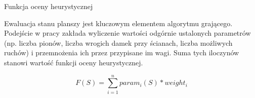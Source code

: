 \begin{frame}{Funkcja oceny heurystycznej}

	Ewaluacja stanu planszy jest kluczowym elementem algorytmu grającego. Podejście w pracy zakłada wyliczenie wartości odgórnie ustalonych parametrów (np. liczba pionów, liczba wrogich damek przy ścianach, liczba możliwych ruchów) i przemnożenia ich przez przypisane im wagi. Suma tych iloczynów stanowi wartość funkcji oceny heurystycznej.

	\[ F(S) = \sum_{i=1}^{n} param_i(S) * weight_i \]

\end{frame}


